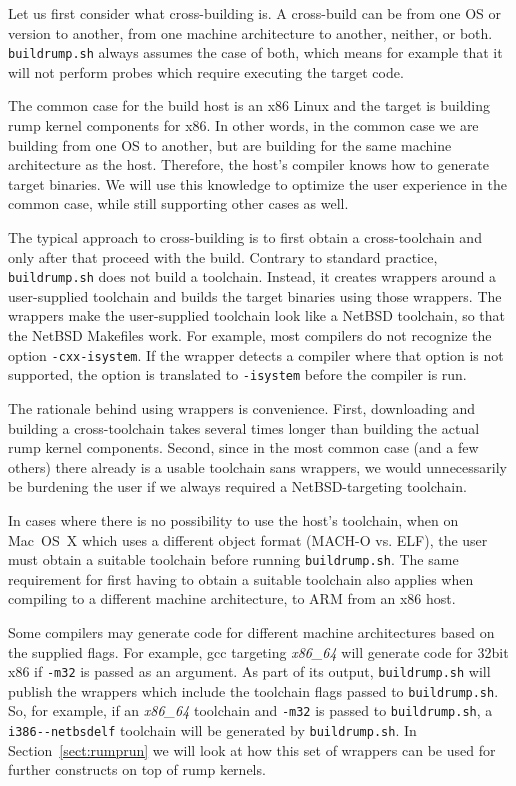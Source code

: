 Let us first consider what cross-building is.  A cross-build can be
from one OS or version to another, from one machine architecture to another,
neither, or both.  \texttt{buildrump.sh} always assumes the case of both,
which means for example that it will not perform probes which require
executing the target code.

The common case for the build host is an x86 Linux and the target is
building rump kernel components for x86.  In other words, in the common
case we are building from one OS to another, but are building for the same
machine architecture as the host.  Therefore, the host's compiler
knows how to generate target binaries.  We will use this knowledge to
optimize the user experience in the common case, while still supporting
other cases as well.

The typical approach to cross-building is to first obtain a
cross-toolchain and only after that proceed with the build.  Contrary to
standard practice, \texttt{buildrump.sh} does not build a toolchain.
Instead, it creates wrappers around a user-supplied toolchain and
builds the target binaries using those wrappers.  The wrappers make the
user-supplied toolchain look like a NetBSD toolchain, so that the NetBSD
Makefiles work.  For example, most compilers do not recognize the option
\texttt{-cxx-isystem}.  If the wrapper detects a compiler where that
option is not supported, the option is translated to \texttt{-isystem}
before the compiler is run.

The rationale behind using wrappers is convenience.  First, downloading
and building a cross-toolchain takes several times longer than building
the actual rump kernel components.  Second, since in the most common case
(and a few others) there already is a usable toolchain sans wrappers,
we would unnecessarily be burdening the user if we always required
a NetBSD-targeting toolchain.

In cases where there is no
possibility to use the host's toolchain, \eg when on Mac~OS~X which
uses a different object format (MACH-O vs. ELF), the user must obtain
a suitable toolchain before running \texttt{buildrump.sh}.  The
same requirement for first having to obtain a suitable toolchain also
applies when compiling to a different machine architecture, \eg to
ARM from an x86 host.

Some compilers may generate code for different machine architectures
based on the supplied flags.  For example, gcc targeting \textit{x86\_64}
will generate code for 32bit x86 if \verb+-m32+ is passed as
an argument.  As part of its output, \texttt{buildrump.sh} will publish
the wrappers which include the toolchain flags passed to
\texttt{buildrump.sh}.  So, for example, if an \textit{x86\_64} toolchain
and \verb+-m32+ is passed to \texttt{buildrump.sh},
a \verb+i386--netbsdelf+ toolchain will be generated by
\texttt{buildrump.sh}.  In Section~\ref{sect:rumprun} we will look at
how this set of wrappers can be used for further constructs on top of
rump kernels.


